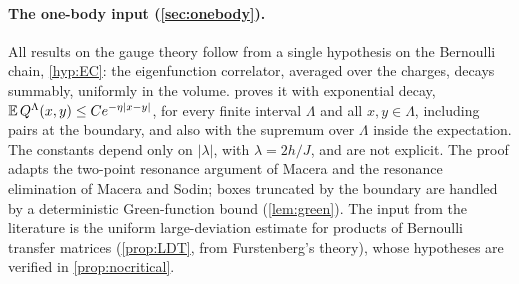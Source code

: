 \documentclass[11pt]{article}
\theoremstyle{stmtplain}
\theoremstyle{stmtdef}
\begin{document}
\paragraph{The one-body input (\cref{sec:onebody}).}
All results on the gauge theory follow from a single hypothesis on the Bernoulli chain, \cref{hyp:EC}: the
eigenfunction correlator, averaged over the charges, decays summably, uniformly in the volume.  proves it
with exponential decay, $\mathbb{E}\,Q^\Lambda(x,y)\le Ce^{-\eta|x-y|}$, for every finite interval $\Lambda$ and all
$x,y\in\Lambda$, including pairs at the boundary, and also with the supremum over $\Lambda$ inside the expectation.
The constants depend only on $|\lambda|$, with $\lambda=2h/J$, and are not explicit. The proof adapts the two-point
resonance argument of Macera and the resonance elimination of Macera and Sodin; boxes truncated by the boundary are
handled by a deterministic Green-function bound (\cref{lem:green}). The input from the literature is the uniform
large-deviation estimate for products of Bernoulli transfer matrices (\cref{prop:LDT}, from Furstenberg's theory),
whose hypotheses are verified in \cref{prop:nocritical}.
\end{document}
